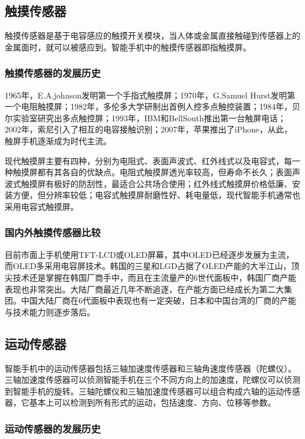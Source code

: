 \documentclass[a4paper,11pt,onecolumn,twoside]{article}
\begin{document}
\begin{multicols}{2}
\subsection{触摸传感器}

触摸传感器是基于电容感应的触摸开关模块，当人体或金属直接触碰到传感器上的金属面时，就可以被感应到。智能手机中的触摸传感器即指触摸屏。

\subsubsection{触摸传感器的发展历史}

1965年，E.A.johnson发明第一个手指式触摸屏；1970年，G.Samuel Hurst发明第一个电阻触摸屏；1982年，多伦多大学研制出首例人控多点触控装置；1984年，贝尔实验室研究出多点触控屏；1993年，IBM和BellSouth推出第一台触屏电话；2002年，索尼引入了相互的电容接触识别；2007年，苹果推出了iPhone，从此，触屏手机逐渐成为时代主流。

现代触摸屏主要有四种，分别为电阻式、表面声波式、红外线式以及电容式\cite{touchScreenClassify}，每一种触摸屏都有其各自的优缺点。电阻式触摸屏透光率较高，但寿命不长久；表面声波式触摸屏有极好的防刮性，最适合公共场合使用；红外线式触摸屏价格低廉、安装方便，但分辨率较低；电容式触摸屏耐磨性好、耗电量低，现代智能手机通常也采用电容式触摸屏。

\subsubsection{国内外触摸传感器比较}

目前市面上手机使用TFT-LCD或OLED屏幕，其中OLED已经逐步发展为主流，而OLED多采用电容屏技术。韩国的三星和LGD占据了OLED产能的大半江山，顶尖技术还是掌握在韩国厂商手中，而且在主流量产的6世代面板中，韩国厂商产能表现也非常突出。大陆厂商最近几年不断追逐，在产能方面已经成长为第二大集团。中国大陆厂商在6代面板中表现也有一定突破，日本和中国台湾的厂商的产能与技术能力则逐步落后。


\subsection{运动传感器}

智能手机中的运动传感器包括三轴加速度传感器和三轴角速度传感器（陀螺仪）。三轴加速度传感器可以侦测智能手机在三个不同方向上的加速度，陀螺仪可以侦测到智能手机的旋转。三轴陀螺仪和三轴加速度传感器可以组合构成六轴的运动传感器，它基本上可以检测到所有形式的运动，包括速度、方向、位移等参数。

\subsubsection{运动传感器的发展历史}


\end{multicols}
\end{document}
